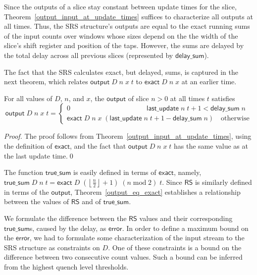 \documentclass{llncs}
\begin{document}
Since the outputs of a slice stay constant between update times for the slice, Theorem~\ref{output_input_at_update_times} suffices to characterize all outputs at all times.
Thus, the SRS structure's outputs are equal to the exact running sums of the input counts over windows whose sizes depend on the the width of the slice's shift register and position of the taps.
However, the sums are delayed by the total delay across all previous slices (represented by $\mathsf{delay\_sum}$).

The fact that the SRS calculates exact, but delayed, sums, is captured in the next theorem, which relates $\mathsf{output}\;D\;n\;x\;t$ to $\mathsf{exact}\;D\;n\;x$ at an earlier time.

\begin{theorem}\label{output_eq_exact}
For all values of $D$, $n$, and $x$, the $\mathsf{output}$ of slice $n>0$ at all times $t$ satisfies
\begin{equation*}
\mathsf{output}\;D\;n\;x\;t=\begin{cases}0\qquad\qquad\qquad\qquad\qquad\quad\mathsf{last\_update}\;n\;t+1<\mathsf{delay\_sum}\;n\\\mathsf{exact}\;D\;n\;x\;(\mathsf{last\_update}\;n\;t+1-\mathsf{delay\_sum}\;n)\quad\text{otherwise}\end{cases}
\end{equation*}
\end{theorem}
\begin{proof}
The proof follows from Theorem~\ref{output_input_at_update_times}, using the definition of $\mathsf{exact}$, and the fact that $\mathsf{output}\;D\;n\;x\;t$ has the same value as at the last update time.\qed
\end{proof}

The function $\mathsf{true\_sum}$ is easily defined in terms of $\mathsf{exact}$, namely, $\mathsf{true\_sum}\;D\;n\;t = \mathsf{exact}\;D\;\left(\left\lfloor\frac{n}{2}\right\rfloor+1\right)\;(n\operatorname{mod}2)\;t$.
Since $\mathsf{RS}$ is similarly defined in terms of the $\mathsf{output}$, Theorem~\ref{output_eq_exact} establishes a relationship between the values of $\mathsf{RS}$ and of $\mathsf{true\_sum}$.

We formulate the difference between the $\mathsf{RS}$ values and their corresponding $\mathsf{true\_sum}$s, caused by the delay, as $\mathsf{error}$.
In order to define a maximum bound on the $\mathsf{error}$, we had to formulate some characterization of the input stream to the SRS structure as constraints on $D$.
One of these constraints is a bound on the difference between two consecutive count values.
Such a bound can be inferred from the highest quench level thresholds.
\end{document}
